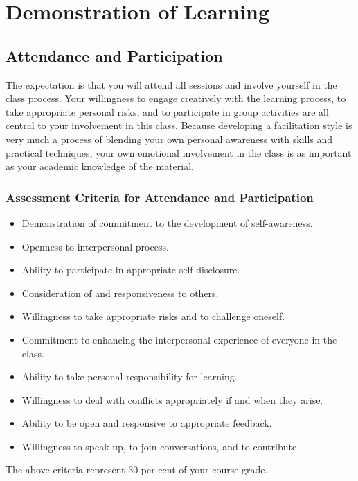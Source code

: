 \documentclass[letterpaper,10pt,headsepline]{scrreprt}
\begin{document}
\section{Demonstration of Learning}
\subsection{Attendance and Participation}
The expectation is that you will attend all sessions and involve
yourself in the class process. Your willingness to engage creatively with the learning process, to take appropriate personal risks, and to participate in group activities are all central to your involvement in this class. Because developing a facilitation style is very much a process of blending your own personal awareness with skills and practical techniques, your own emotional involvement in the class is as
important as your academic knowledge of the material.

\subsubsection{Assessment Criteria for Attendance and Participation}

\begin{itemize}
\item Demonstration of commitment to the development of self-awareness.
\item Openness to interpersonal process.
\item Ability to participate in appropriate self-disclosure.
\item Consideration of and responsiveness to others.
\item Willingness to take appropriate risks and to challenge oneself.
\item Commitment to enhancing the interpersonal experience of everyone in the class.
\item Ability to take personal responsibility for learning.
\item Willingness to deal with conflicts appropriately if and when they arise.
\item Ability to be open and responsive to appropriate feedback.
\item Willingness to speak up, to join conversations, and to contribute.
\end{itemize}

The above criteria represent 30 per cent of your course grade. 
\end{document}
